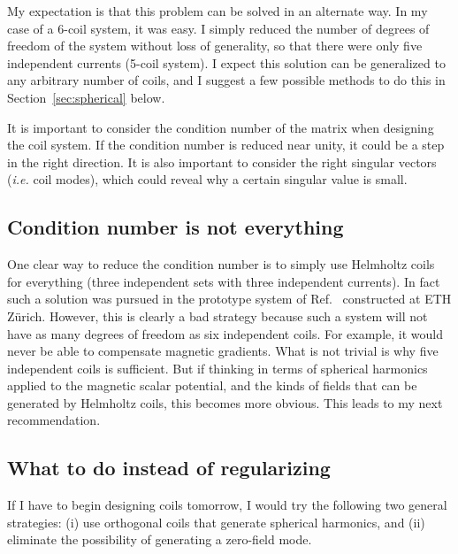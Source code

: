 My expectation is that this problem can be solved in an alternate way. In my case of a 6-coil system, it was easy. I simply reduced the number of degrees of freedom of the system without loss of generality, so that there were only five independent currents (5-coil system). I expect this solution can be generalized to any arbitrary number of coils, and I suggest a few possible methods to do this in Section~\ref{sec:spherical} below.

It is important to consider the condition number of the matrix when designing the coil system.  If the condition number is reduced near unity, it could be a step in the right direction.  It is also important to consider the right singular vectors ({\it i.e.} coil modes), which could reveal why a certain singular value is small.


\subsection{Condition number is not everything}

One clear way to reduce the condition number is to simply use Helmholtz coils for everything (three independent sets with three independent currents).  In fact such a solution was pursued in the prototype system of Ref.~\cite{rawlik} constructed at ETH Z\"urich. However, this is clearly a bad strategy because such a system will not have as many degrees of freedom as six independent coils.  For example, it would never be able to compensate magnetic gradients. What is not trivial is why five independent coils is sufficient.  But if thinking in terms of spherical harmonics applied to the magnetic scalar potential, and the kinds of fields that can be generated by Helmholtz coils, this becomes more obvious.  This leads to my next recommendation.


\subsection{What to do instead of regularizing\label{sec:spherical}}
If I have to begin designing coils tomorrow, I would try the following two general strategies: (i) use orthogonal coils that generate spherical harmonics, and (ii) eliminate the possibility of generating a zero-field mode.


